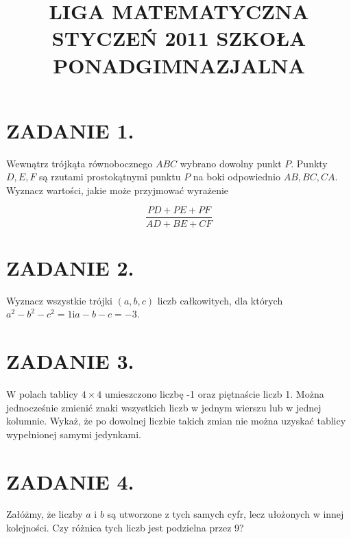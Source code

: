 \documentclass[10pt]{article}
\title{LIGA MATEMATYCZNA STYCZEŃ 2011 SZKOŁA PONADGIMNAZJALNA }
\author{}
\date{}
\begin{document}
\maketitle
\section*{ZADANIE 1.}
Wewnątrz trójkąta równobocznego \(A B C\) wybrano dowolny punkt \(P\). Punkty \(D, E, F\) są rzutami prostokątnymi punktu \(P\) na boki odpowiednio \(A B, B C, C A\). Wyznacz wartości, jakie może przyjmować wyrażenie

\[
\frac{P D+P E+P F}{A D+B E+C F}
\]

\section*{ZADANIE 2.}
Wyznacz wszystkie trójki \((a, b, c)\) liczb całkowitych, dla których \(a^{2}-b^{2}-c^{2}=1 \mathrm{i} a-b-c=-3\).

\section*{ZADANIE 3.}
W polach tablicy \(4 \times 4\) umieszczono liczbę -1 oraz piętnaście liczb 1. Można jednocześnie zmienić znaki wszystkich liczb w jednym wierszu lub w jednej kolumnie. Wykaż, że po dowolnej liczbie takich zmian nie można uzyskać tablicy wypełnionej samymi jedynkami.

\section*{ZADANIE 4.}
Załóżmy, że liczby \(a\) i \(b\) są utworzone z tych samych cyfr, lecz ułożonych w innej kolejności. Czy różnica tych liczb jest podzielna przez 9?
\end{document}
